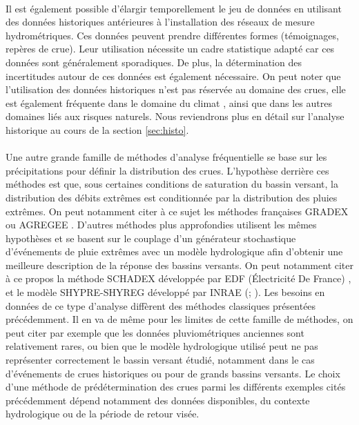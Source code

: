 	\paragraph{} Il est également possible d'élargir temporellement le jeu de données en utilisant des données historiques antérieures à l'installation des réseaux de mesure hydrométriques. Ces données peuvent prendre différentes formes (témoignages, repères de crue). Leur utilisation nécessite un cadre statistique adapté car ces données sont généralement sporadiques. De plus, la détermination des incertitudes autour de ces données est également nécessaire. On peut noter que l'utilisation des données historiques n'est pas réservée au domaine des crues, elle est également fréquente dans le domaine du climat \citep{ribes_making_2021}, ainsi que dans les autres domaines liés aux risques naturels. Nous reviendrons plus en détail sur l'analyse historique au cours de la section \ref{sec:histo}.
	
	\paragraph{} Une autre grande famille de méthodes d'analyse fréquentielle se base sur les précipitations pour définir la distribution des crues. L'hypothèse derrière ces méthodes est que, sous certaines conditions de saturation du bassin versant, la distribution des débits extrêmes est conditionnée par la distribution des pluies extrêmes. On peut notamment citer à ce sujet les méthodes françaises GRADEX \citep{guillot_methode_1967} ou AGREGEE \citep{margoum_estimation_1994}. D'autres méthodes plus approfondies utilisent les mêmes hypothèses et se basent sur le couplage d'un générateur stochastique d'événements de pluie extrêmes avec un modèle hydrologique afin d'obtenir une meilleure description de la réponse des bassins versants. On peut notamment citer à ce propos la méthode SCHADEX développée par EDF (Électricité De France) \citep{paquet_schadex_2013}, et le modèle SHYPRE-SHYREG développé par INRAE (\cite{arnaud_coupled_2002}; \cite{aubert_methode_2014}). Les besoins en données de ce type d'analyse diffèrent des méthodes classiques présentées précédemment. Il en va de même pour les limites de cette famille de méthodes, on peut citer par exemple que les données pluviométriques anciennes sont relativement rares, ou bien que le modèle hydrologique utilisé peut ne pas représenter correctement le bassin versant étudié, notamment dans le cas d'événements de crues historiques ou pour de grands bassins versants. Le choix d'une méthode de prédétermination des crues parmi les différents exemples cités précédemment dépend notamment des données disponibles, du contexte hydrologique ou de la période de retour visée.
		
